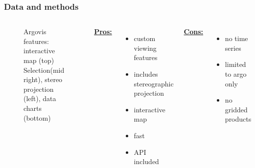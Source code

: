 \begin{frame}
\frametitle{Data and methods}
\begin{columns}
\begin{figure}
\vspace*{-.6cm}
\begin{minipage}{1\columnwidth}
\centering
{}
\caption{\tiny{Argovis features: interactive map (top) Selection(mid right), stereo projection (left), data charts (bottom)}}
\end{minipage}
\end{figure}
\small{\underline{\textbf{Pros:}}}
\begin{itemize}
    \item custom viewing features
    \item includes stereographic projection
    \item interactive map
    \item fast
    \item API included
\end{itemize}
\small{\underline{\textbf{Cons:}}}
\begin{itemize}
    \item no time series
    \item limited to argo only
    \item no gridded products
\end{itemize}
\end{columns}
\end{frame}